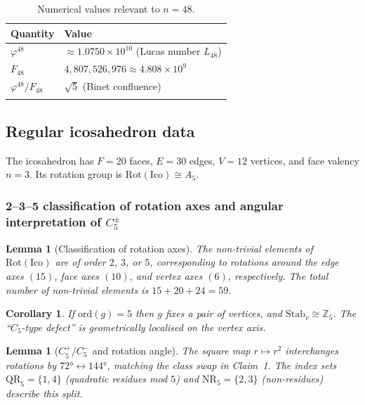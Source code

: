 \documentclass[sn-mathphys-num,Numbered]{sn-jnl}
\theoremstyle{thmstyleone}
\newtheorem{lemma}[theorem]{Lemma}
\newtheorem{corollary}[theorem]{Corollary}
\theoremstyle{thmstylethree}
\theoremstyle{thmstyletwo}
\begin{document}
\begin{table}[h]
\caption{Numerical values relevant to $n = 48$.}
\label{tab:binet}
\begin{tabular}{@{}ll@{}}
\toprule
Quantity & Value \\
\midrule
$\varphi^{48}$ & $\approx 1.0750\times10^{10}$ (Lucas number $L_{48}$) \\
$F_{48}$ & $4{,}807{,}526{,}976 \approx 4.808\times10^{9}$ \\
$\varphi^{48}/F_{48}$ & $\sqrt{5}$ \quad (Binet confluence) \\
\botrule
\end{tabular}
\end{table}

\subsection{Regular icosahedron data}
\label{ssec:icosahedron}

The icosahedron has $F = 20$ faces, $E = 30$ edges, $V = 12$ vertices,
and face valency $n = 3$.  Its rotation group is
$\mathrm{Rot}(\mathrm{Ico}) \cong A_5$.

\subsubsection{2--3--5 classification of rotation axes and angular
interpretation of \texorpdfstring{$C_5^\pm$}{C5±}}
\label{sssec:axes}

\begin{lemma}[Classification of rotation axes]
\label{lem:axes}
The non-trivial elements of $\mathrm{Rot}(\mathrm{Ico})$ are of order
$2$, $3$, or $5$, corresponding to rotations around the edge axes $(15)$,
face axes $(10)$, and vertex axes $(6)$, respectively. The total number
of non-trivial elements is $15 + 20 + 24 = 59$.
\end{lemma}

\begin{corollary}
\label{cor:vertex-stab}
If $\mathrm{ord}(g) = 5$ then $g$ fixes a pair of vertices, and
$\mathrm{Stab}_v \cong \mathbb{Z}_5$. The ``$C_5$-type defect'' is
geometrically localised on the vertex axis.
\end{corollary}

\begin{lemma}[$C_5^+/C_5^-$ and rotation angle]
\label{lem:square-map}
The square map $r\mapsto r^2$ interchanges rotations by $72°
\leftrightarrow 144°$, matching the class swap in Claim~1.  The index
sets $\mathrm{QR}_5 = \{1,4\}$ (quadratic residues mod $5$) and
$\mathrm{NR}_5 = \{2,3\}$ (non-residues) describe this split.
\end{lemma}
\end{document}
